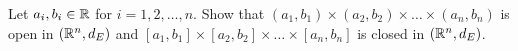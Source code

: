 \begin{problem}
  Let $a_i, b_i \in \mathbb{R}$ for $i = 1, 2, \dots, n$.
  Show that $(a_1, b_1) \times (a_2, b_2) \times \dots \times (a_n, b_n)$
  is open in $(\mathbb{R}^n, d_E)$ and
  $[a_1, b_1] \times [a_2, b_2] \times \dots \times [a_n, b_n]$
  is closed in $(\mathbb{R}^n, d_E)$.
\end{problem}
\begin{answer}

\end{answer}
